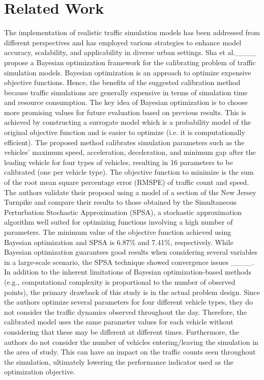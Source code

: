 \section{Related Work}
\label{sec:relatedwork}

The implementation of realistic traffic simulation models has been addressed from different perspectives and has employed various strategies to enhance model accuracy, scalability, and applicability in diverse urban settings. Sha et al.____ propose a Bayesian optimization framework for the calibrating problem of traffic simulation models. Bayesian optimization is an approach to optimize expensive objective functions. Hence, the benefits of the suggested calibration method because traffic simulations are generally expensive in terms of simulation time and resource consumption. The key idea of Bayesian optimization is to choose more promising values for future evaluation based on previous results. This is achieved by constructing a surrogate model which is a probability model of the original objective function and is easier to optimize (i.e. it is computationally efficient). The proposed method calibrates simulation parameters such as the vehicles' maximum speed, acceleration, deceleration, and minimum gap after the leading vehicle for four types of vehicles, resulting in 16 parameters to be calibrated (one per vehicle type). The objective function to minimize is the sum of the root mean square percentage error (RMSPE) of traffic count and speed. The authors validate their proposal using a model of a section of the New Jersey Turnpike and compare their results to those obtained by the Simultaneous Perturbation Stochastic Approximation (SPSA), a stochastic approximation algorithm well suited for optimizing functions involving a high number of parameters. The minimum value of the objective function achieved using Bayesian optimization and SPSA is 6.87\% and 7.41\%, respectively. While Bayesian optimization guarantees good results when considering several variables in a large-scale scenario, the SPSA technique showed convergence issues ____. In addition to the inherent limitations of Bayesian optimization-based methods (e.g., computational complexity is proportional to the number of observed points), the primary drawback of this study is in the actual problem design. Since the authors optimize several parameters for four different vehicle types, they do not consider the traffic dynamics observed throughout the day. Therefore, the calibrated model uses the same parameter values for each vehicle without considering that these may be different at different times. Furthermore, the authors do not consider the number of vehicles entering/leaving the simulation in the area of study. This can have an impact on the traffic counts seen throughout the simulation, ultimately lowering the performance indicator used as the optimization objective.

